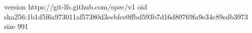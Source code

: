 version https://git-lfs.github.com/spec/v1
oid sha256:1b1d5f6a973011af57380d3eebfce0ffbd593b7d16d80769fa9e34c89edb3973
size 991
